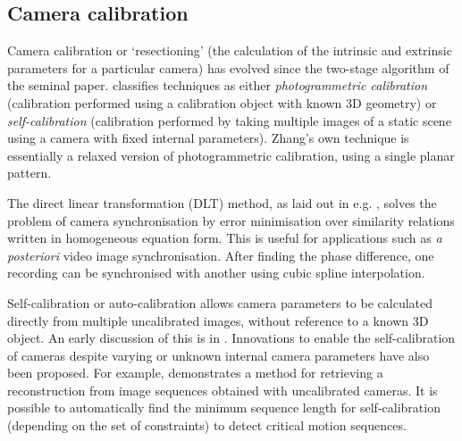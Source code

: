 \subsection{Camera calibration}

Camera calibration or `resectioning' (the calculation of the intrinsic and extrinsic parameters for a particular camera) has evolved since the two-stage algorithm of the seminal \cite{TSAI} paper. \cite{ZHANG} classifies techniques as either \emph{photogrammetric calibration} (calibration performed using a calibration object with known 3D geometry) or \emph{self-calibration} (calibration performed by taking multiple images of a static scene using a camera with fixed internal parameters). Zhang's own technique is essentially a relaxed version of photogrammetric calibration, using a single planar pattern.

The direct linear transformation (DLT) method, as laid out in e.g. \cite{direct-linear}, solves the problem of camera synchronisation by error minimisation over similarity relations written in homogeneous equation form. This is useful for applications such as \emph{a posteriori} video image synchronisation. After finding the phase difference, one recording can be synchronised with another using cubic spline interpolation.

Self-calibration or auto-calibration allows camera parameters to be calculated directly from multiple uncalibrated images, without reference to a known 3D object. An early discussion of this is in \cite{self-calib}. Innovations to enable the self-calibration of cameras despite varying or unknown internal camera parameters have also been proposed. For example, \cite{self-calibration-unknown} demonstrates a method for retrieving a reconstruction from image sequences obtained with uncalibrated cameras. It is possible to automatically find the minimum sequence length for self-calibration (depending on the set of constraints) to detect critical motion sequences.
